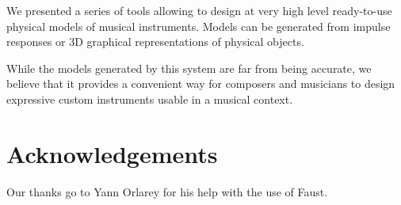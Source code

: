 \documentclass[11pt,a4paper]{article}
\begin{document}
We presented a series of tools allowing to design at very high level ready-to-use physical models of musical instruments. Models can be generated from impulse responses or 3D graphical representations of physical objects.

While the models generated by this system are far from being accurate, we believe that it provides a convenient way for composers and musicians to design expressive custom instruments usable in a musical context.  


\section{Acknowledgements}

Our thanks go to Yann Orlarey for his help with the use of Faust.



\end{document}
